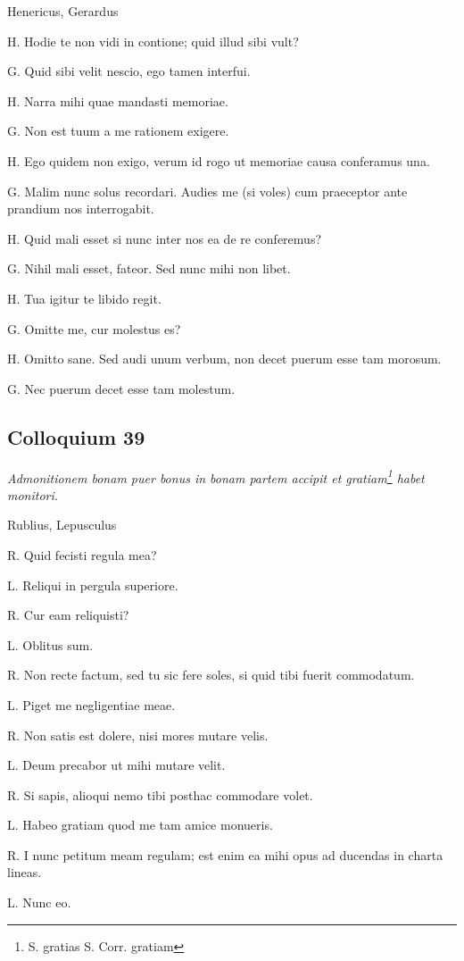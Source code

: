 \documentclass{article}
\begin{document}
Henericus, Gerardus

H. Hodie te non vidi in contione; quid illud sibi vult?

G. Quid sibi velit nescio, ego tamen interfui. 

H. Narra mihi quae mandasti memoriae. 

G. Non est tuum a me rationem exigere. 

H. Ego quidem non exigo, verum id rogo ut memoriae causa conferamus una. 

G. Malim nunc solus recordari. Audies me (si voles) cum praeceptor ante prandium nos interrogabit. 

H. Quid mali esset si nunc inter nos ea de re conferemus?

G. Nihil mali esset, fateor. Sed nunc mihi non libet. 

H. Tua igitur te libido regit. 

G. Omitte me, cur molestus es?

H. Omitto sane. Sed audi unum verbum, non decet puerum esse tam morosum.

G. Nec puerum decet esse tam molestum. 

\subsection{Colloquium 39}
\emph{Admonitionem bonam puer bonus in bonam partem accipit et gratiam\footnote{S. gratias S. Corr. gratiam} habet monitori.}

Rublius, Lepusculus

R. Quid fecisti regula mea?

L. Reliqui in pergula superiore. 

R. Cur eam reliquisti?

L. Oblitus sum. 

R. Non recte factum, sed tu sic fere soles, si quid tibi fuerit commodatum. 

L. Piget me negligentiae meae. 

R. Non satis est dolere, nisi mores mutare velis. 

L. Deum precabor ut mihi mutare velit. 

R. Si sapis, alioqui nemo tibi posthac commodare volet. 

L. Habeo gratiam quod me tam amice monueris. 

R. I nunc petitum meam regulam; est enim ea mihi opus ad ducendas in charta lineas. 

L. Nunc eo. 
\end{document}
